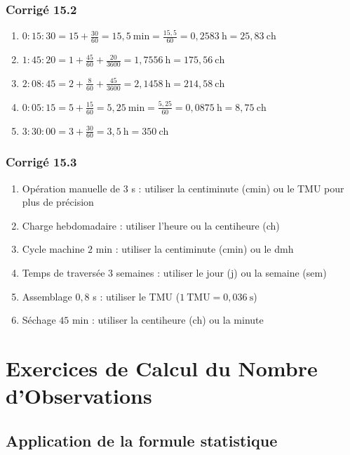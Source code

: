 \documentclass[a4paper,12pt]{article}
\begin{document}
\subsubsection*{Corrigé 15.2}

\begin{enumerate}
    \item $0:15:30 = 15 + \frac{30}{60} = 15,5\ \text{min} = \frac{15,5}{60} = 0,2583\ \text{h} = 25,83\ \text{ch}$
    \item $1:45:20 = 1 + \frac{45}{60} + \frac{20}{3600} = 1,7556\ \text{h} = 175,56\ \text{ch}$
    \item $2:08:45 = 2 + \frac{8}{60} + \frac{45}{3600} = 2,1458\ \text{h} = 214,58\ \text{ch}$
    \item $0:05:15 = 5 + \frac{15}{60} = 5,25\ \text{min} = \frac{5,25}{60} = 0,0875\ \text{h} = 8,75\ \text{ch}$
    \item $3:30:00 = 3 + \frac{30}{60} = 3,5\ \text{h} = 350\ \text{ch}$
\end{enumerate}

\subsubsection*{Corrigé 15.3}

\begin{enumerate}
    \item Opération manuelle de $3$ s : utiliser la centiminute (cmin) ou le TMU pour plus de précision
    \item Charge hebdomadaire : utiliser l'heure ou la centiheure (ch)
    \item Cycle machine $2$ min : utiliser la centiminute (cmin) ou le dmh
    \item Temps de traversée $3$ semaines : utiliser le jour (j) ou la semaine (sem)
    \item Assemblage $0,8$ s : utiliser le TMU ($1\ \text{TMU} = 0,036\ \text{s}$)
    \item Séchage $45$ min : utiliser la centiheure (ch) ou la minute
\end{enumerate}

\section{Exercices de Calcul du Nombre d'Observations}

\subsection{Application de la formule statistique}
\end{document}
